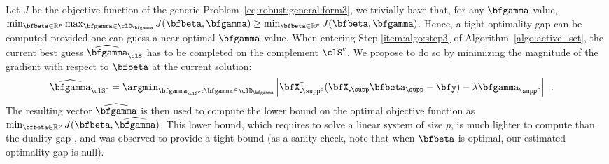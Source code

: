 \iffalse
  Let $J$ be the objective function of the generic
  Problem~\eqref{eq:robust:general:form3}, we trivially have that, for any
  $\bfgamma$-value,
  $\min_{\bfbeta\in\mathbb{R}^{p}} \max_{\bfgamma \in \clD_{\bfgamma}}
  J(\bfbeta,\bfgamma) \geq \min_{\bfbeta\in\mathbb{R}^{p}} J(\bfbeta,\bfgamma)$.
  Hence, a tight optimality gap can be computed provided one can guess a
  near-optimal $\bfgamma$-value.
  When entering Step \ref{item:algo:step3} of Algorithm~\ref{algo:active_set}, the current best guess
  $\widehat\bfgamma_{\clS}$ has to be completed on the complement $\clS^c$.
  We propose to do so by minimizing the magnitude of the gradient with respect to $\bfbeta$ at the current solution:
  \begin{align*}
    \widehat\bfgamma_{\clS^c} & = \argmin_{\bfgamma_{\clS^c}:\bfgamma \in \clD_{\bfgamma}}
                               \left|  \bfX_{\centerdot\supp^c}^\intercal(\bfX_{\centerdot\supp}\bfbeta_{\supp}-\bfy) - 
                               \lambda \bfgamma_{\supp^c} \right|
      \enspace.
  \end{align*}
  The resulting vector $\widehat\bfgamma$ is then used to compute the lower
  bound on the optimal objective function as $\min_{\bfbeta\in\mathbb{R}^{p}} J(\bfbeta,\widehat\bfgamma)$. 
  This lower bound, which requires to solve a linear system of size $p$, is
  much lighter to compute than the duality gap \citep[see details
  in][]{2012_FML_Bach}, and was observed to provide a tight bound (as a sanity
  check, note that when $\bfbeta$ is optimal, our estimated optimality gap is null).

%

